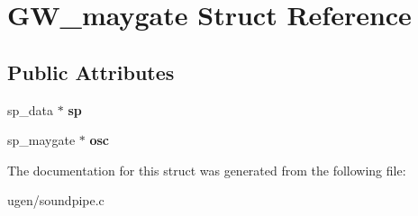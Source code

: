 \hypertarget{structGW__maygate}{}\section{G\+W\+\_\+maygate Struct Reference}
\label{structGW__maygate}
\subsection*{Public Attributes}
\begin{DoxyCompactItemize}
\item 
\hypertarget{structGW__maygate_ab8412269ebde6ba9c87d06f4105da891}{}\label{structGW__maygate_ab8412269ebde6ba9c87d06f4105da891} 
sp\+\_\+data $\ast$ {\bfseries sp}
\item 
\hypertarget{structGW__maygate_aeb2437da410a1596fb3340906ecda0fe}{}\label{structGW__maygate_aeb2437da410a1596fb3340906ecda0fe} 
sp\+\_\+maygate $\ast$ {\bfseries osc}
\end{DoxyCompactItemize}


The documentation for this struct was generated from the following file\+:\begin{DoxyCompactItemize}
\item 
ugen/soundpipe.\+c\end{DoxyCompactItemize}
